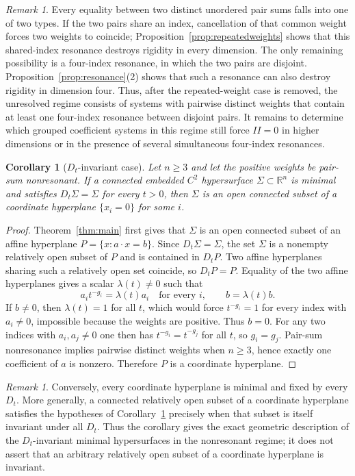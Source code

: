 \documentclass[preprint,12pt]{elsarticle}
\numberwithin{equation}{section}
\newtheorem{corollary}[theorem]{Corollary}
\theoremstyle{definition}\newtheorem{definition}[theorem]{Definition}
\theoremstyle{remark}\newtheorem{remark}[theorem]{Remark}
\begin{document}
\begin{remark}\label{rem:resonance-open}
Every equality between two distinct unordered pair sums falls into one of two types. If the two pairs share an index, cancellation of that common weight forces two weights to coincide; Proposition~\ref{prop:repeatedweights} shows that this shared-index resonance destroys rigidity in every dimension. The only remaining possibility is a four-index resonance, in which the two pairs are disjoint. Proposition~\ref{prop:resonance}(2) shows that such a resonance can also destroy rigidity in dimension four. Thus, after the repeated-weight case is removed, the unresolved regime consists of systems with pairwise distinct weights that contain at least one four-index resonance between disjoint pairs. It remains to determine which grouped coefficient systems in this regime still force $II=0$ in higher dimensions or in the presence of several simultaneous four-index resonances.
\end{remark}

\begin{corollary}[$D_t$-invariant case]\label{cor:invariant}
Let $n\ge3$ and let the positive weights be pair-sum nonresonant. If a connected embedded $C^2$ hypersurface $\Sigma\subset\mathbb R^n$ is minimal and satisfies $D_t\Sigma=\Sigma$ for every $t>0$, then $\Sigma$ is an open connected subset of a coordinate hyperplane $\{x_i=0\}$ for some $i$.
\end{corollary}
\begin{proof}
Theorem~\ref{thm:main} first gives that $\Sigma$ is an open connected subset of an affine hyperplane $P=\{x:a\cdot x=b\}$. Since $D_t\Sigma=\Sigma$, the set $\Sigma$ is a nonempty relatively open subset of $P$ and is contained in $D_tP$. Two affine hyperplanes sharing such a relatively open set coincide, so $D_tP=P$. Equality of the two affine hyperplanes gives a scalar $\lambda(t)\ne0$ such that
\[
a_it^{-g_i}=\lambda(t)a_i\quad\text{for every }i,
\qquad b=\lambda(t)b.
\]
If $b\ne0$, then $\lambda(t)=1$ for all $t$, which would force $t^{-g_i}=1$ for every index with $a_i\ne0$, impossible because the weights are positive. Thus $b=0$. For any two indices with $a_i,a_j\ne0$ one then has $t^{-g_i}=t^{-g_j}$ for all $t$, so $g_i=g_j$. Pair-sum nonresonance implies pairwise distinct weights when $n\ge3$, hence exactly one coefficient of $a$ is nonzero. Therefore $P$ is a coordinate hyperplane.
\end{proof}

\begin{remark}
Conversely, every coordinate hyperplane is minimal and fixed by every $D_t$. More generally, a connected relatively open subset of a coordinate hyperplane satisfies the hypotheses of Corollary~\ref{cor:invariant} precisely when that subset is itself invariant under all $D_t$. Thus the corollary gives the exact geometric description of the $D_t$-invariant minimal hypersurfaces in the nonresonant regime; it does not assert that an arbitrary relatively open subset of a coordinate hyperplane is invariant.
\end{remark}
\end{document}
